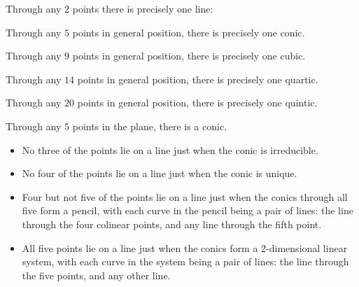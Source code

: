 \begin{example}
Through any \(2\) points there is precisely one line: 
\end{example}
\begin{example}
Through any \(5\) points in general position, there is precisely one conic.
\end{example}
\begin{example}
Through any \(9\) points in general position, there is precisely one cubic.
\end{example}
\begin{example}
Through any \(14\) points in general position, there is precisely one quartic.
\end{example}
\begin{example}
Through any \(20\) points in general position, there is precisely one quintic.
\end{example}
\begin{lemma}\label{lemma:conics.5.points}
Through any \(5\) points in the plane, there is a conic.
\begin{itemize}
\item
No three of the points lie on a line just when the conic is irreducible.
\item
No four of the points lie on a line just when the conic is unique.
\item
Four but not five of the points lie on a line just when the conics through all five form a pencil, with each curve in the pencil being a pair of lines: the line through the four colinear points, and any line through the fifth point.
\item
All five points lie on a line just when the conics form a \(2\)-dimensional linear system, with each curve in the system being a pair of lines: the line through the five points, and any other line.
\end{itemize}
\end{lemma}
